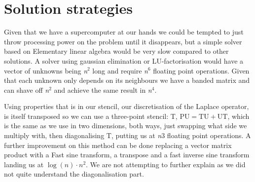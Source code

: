 \section{Solution strategies}
Given that we have a supercomputer at our hands we could be tempted to just
throw processing power on the problem until it disappears, but a simple solver
based on Elementary linear algebra would be very slow compared to other
solutions. A solver using gaussian elimination or LU-factorisation would have a
vector of unknowns being \emph{n}$^2$ long and require \emph{n}$^6$ floating
point operations. Given that each unknown only depends on its neighbours we have
a banded matrix and can shave off \emph{n}$^2$ and achieve the same result in
\emph{n}$^4$. 

Using properties that is in our stencil, our discretisation of the Laplace
operator, is itself transposed so we can use a three-point stencil: T, $\mathrm{PU}=\mathrm{TU+UT}$, which is
the same as we use in two dimensions, both ways, just swapping what side we
multiply with, then diagonalising T, putting us at \emph{n}$3$ floating point
operations. A further improvement on this method can be done replacing a vector
matrix product with a Fast sine transform, a transpose and a fast inverse sine
transform landing us at $\log(n)\cdot n^2$. We are not attempting to further
explain as we did not quite understand the diagonalisation part. 
	
